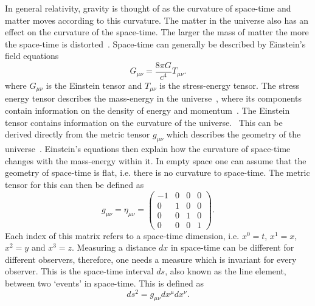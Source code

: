 In general relativity, gravity is thought of as the curvature of space-time and
matter moves according to this curvature.  The matter in the universe also has
an effect on the curvature of the space-time.  The larger the mass of matter
the more the space-time is distorted~.  Space-time can generally be described by Einstein's field
equations~
\begin{equation}
\label{intro:gravwaves:efe}
    G_{\mu \nu} = \frac{8 \pi G}{c^4}T_{\mu \nu}.
\end{equation}
where $G_{\mu \nu}$ is the Einstein tensor and $T_{\mu \nu}$ is the
stress-energy tensor.  The stress energy tensor describes the mass-energy in
the universe~, where its components contain
information on the density of energy and momentum~.  The
Einstein tensor contains information on the curvature of the
universe.~ This can be derived directly from the metric tensor $g_{\mu \nu}$
which describes the geometry of the universe~.
Einstein's equations then explain how the curvature of space-time changes with
the mass-energy within it.  In empty space one can assume that the geometry of
space-time is flat, i.e. there is no curvature to space-time. The metric tensor
for this can then be defined as
\begin{equation}
g_{\mu \nu} = \eta_{\mu \nu} = \left(
\begin{matrix}
-1 & 0 & 0 & 0 \\
0 & 1 & 0 & 0 \\
0 & 0 & 1 & 0 \\
0 & 0 & 0 & 1 
\end{matrix}
\right).
\end{equation}
Each index of this matrix refers to a space-time dimension, i.e. $x^0 = t$,
$x^1=x$, $x^2=y$ and $x^3=z$.  Measuring a distance $dx$ in space-time can be
different for different observers, therefore, one needs a measure which is
invariant for every observer.  This is the space-time interval $ds$, also known
as the line element, between two `events' in space-time.  This is defined as
\begin{equation}
\label{intro:lineelement}
    ds^2 = g_{\mu \nu} dx^{\mu}dx^{\nu}.
\end{equation}


